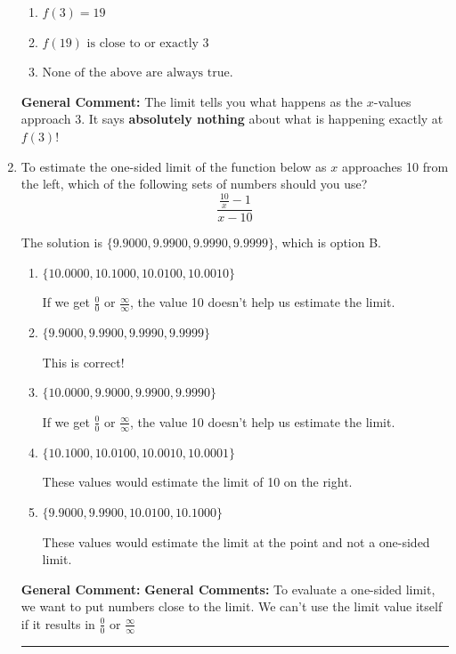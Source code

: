 \documentclass{extbook}[14pt]
\newcommand{\litem}[1]{\item #1

\rule{\textwidth}{0.4pt}}
\begin{document}
\begin{enumerate}
{\begin{enumerate}[label=\Alph*.]
\item \( f(3) = 19 \)


\item \( f(19) \text{ is close to or exactly } 3 \)


\item \( \text{None of the above are always true.} \)


\end{enumerate}

\textbf{General Comment:} The limit tells you what happens as the $x$-values approach $3$. It says \textbf{absolutely nothing} about what is happening exactly at $f(3)$!
}
\litem{
To estimate the one-sided limit of the function below as $x$ approaches 10 from the left, which of the following sets of numbers should you use?
\[ \frac{\frac{10}{x} - 1}{x - 10} \]

The solution is \( \{ 9.9000, 9.9900, 9.9990, 9.9999 \} \), which is option B.\begin{enumerate}[label=\Alph*.]
\item \( \{ 10.0000, 10.1000, 10.0100, 10.0010 \} \)

If we get $\frac{0}{0}$ or $\frac{\infty}{\infty}$, the value 10 doesn't help us estimate the limit.
\item \( \{ 9.9000, 9.9900, 9.9990, 9.9999 \} \)

This is correct!
\item \( \{ 10.0000, 9.9000, 9.9900, 9.9990 \} \)

If we get $\frac{0}{0}$ or $\frac{\infty}{\infty}$, the value 10 doesn't help us estimate the limit.
\item \( \{ 10.1000, 10.0100, 10.0010, 10.0001 \} \)

These values would estimate the limit of 10 on the right.
\item \( \{ 9.9000, 9.9900, 10.0100, 10.1000 \} \)

These values would estimate the limit at the point and not a one-sided limit.
\end{enumerate}

\textbf{General Comment:} \textbf{General Comments:} To evaluate a one-sided limit, we want to put numbers close to the limit. We can't use the limit value itself if it results in $\frac{0}{0}$ or $\frac{\infty}{\infty}$
}
\end{enumerate}
\end{document}
